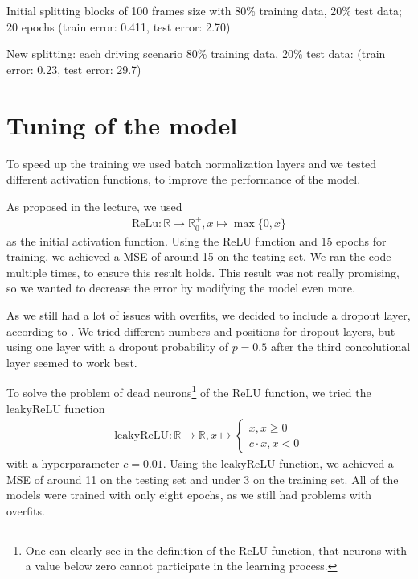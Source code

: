 \documentclass[conference]{IEEEtran}
\begin{document}
Initial splitting blocks of 100 frames size with 80\% training data, 20\% test data; 20 epochs (train error: 0.411, test error: 2.70)

New splitting: each driving scenario 80\% training data, 20\% test data: (train error: 0.23, test error: 29.7)


\section{Tuning of the model}
To speed up the training we used batch normalization layers \cite{BatchNorm2015} 
and we tested different activation functions, to improve the performance of the model. 

As proposed in the lecture, we used
\begin{align*}
\mathrm{ReLu}: \mathbb{R} \to \mathbb{R}_0^+, x \mapsto \max\{0,x\}
\end{align*}
as the initial activation function. Using the ReLU function and 15 epochs for training, we achieved a MSE of around 15 on the 
testing set. We ran the 
code multiple times, to ensure this result holds. This result was not really promising, so we wanted to decrease the error by 
modifying the model even more.

As we still had a lot of issues with overfits, we decided to include a dropout layer, according to \cite{Dropout2014}. We tried different numbers and positions for dropout layers, but using one layer with a dropout 
probability of $p=0.5$ after the third concolutional layer seemed to work best.

To solve the problem of dead neurons\footnote{One can clearly see in the definition of the ReLU 
function, that neurons with a value below zero cannot participate in the learning process.} of the ReLU function, we 
tried the leakyReLU function
\begin{align*}
\mathrm{leakyReLU} : \mathbb{R} \to \mathbb{R}, x \mapsto \begin{cases}
x, x \geq 0\\
c \cdot x, x <0
\end{cases}
\end{align*}
with a hyperparameter $c = 0.01$. Using the leakyReLU function, we achieved a MSE of around 11 on the testing set and under 3 on the 
training set. All of the models were trained with only eight epochs, as we still had problems with overfits.
\end{document}
